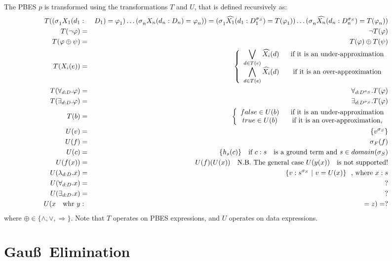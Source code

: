\documentclass{article}
\begin{document}
The PBES $p$ is transformed using the transformations $T$ and $U$, that is
defined recursively as:%
\begin{eqnarray*}
T(\mathcal{(\sigma }_{1}X_{1}(d_{1} &:&D_{1})=\varphi _{1})\ldots \mathcal{%
(\sigma }_{n}X_{n}(d_{n}:D_{n})=\varphi _{n}))=\mathcal{(\sigma }_{1}%
\widehat{X_{1}}(d_{1}:D_{1}^{\sigma _{S}})=T(\varphi _{1}))\ldots \mathcal{%
(\sigma }_{n}\widehat{X_{n}}(d_{n}:D_{n}^{\sigma _{S}})=T(\varphi _{n})) \\
T(\lnot \varphi ) &=&\lnot T(\varphi ) \\
T(\varphi \oplus \psi ) &=&T(\varphi )\oplus T(\psi ) \\
T(X_{i}(e)) &=&\left\{ 
\begin{array}{cc}
\dbigvee\limits_{d\in T(e)}\widehat{X_{i}}(d) & \text{if it is an
under-approximation} \\ 
\dbigwedge\limits_{d\in T(e)}\widehat{X_{i}}(d) & \text{if it is an
over-approximation}%
\end{array}%
\right. \\
T(\forall _{d:D}.\varphi ) &=&\forall _{d:D^{\sigma _{S}}}.T(\varphi ) \\
T(\exists _{d:D}.\varphi ) &=&\exists _{d:D^{\sigma _{S}}}.T(\varphi ) \\
T(b) &=&\left\{ 
\begin{array}{cc}
false\in U(b) & \text{if it is an under-approximation} \\ 
true\in U(b) & \text{if it is an over-approximation,}%
\end{array}%
\right. \\
U(v) &=&\{v^{\sigma _{S}}\} \\
U(f) &=&\mathcal{\sigma }_{F}(f) \\
U(c) &=&\{h_{s}(c)\}\text{ if }c:s\text{ is a ground term and }s\in
domain(\sigma _{S}) \\
U(f(x)) &=&U(f)(U(x))\text{ N.B. The general case }U(y(x))\text{ is not
supported!} \\
U(\lambda _{d:D}.x) &=&\{v:s^{\sigma _{S}}\ |\ v=U(x)\}\text{, where }x:s \\
U(\forall _{d:D}.x) &=&? \\
U(\exists _{d:D}.x) &=&? \\
U(x\text{ whr }y &:&=z)=?
\end{eqnarray*}%
where $\oplus \in \{\wedge ,\vee ,\Rightarrow \}$. Note that $T$ operates on
PBES expressions, and $U$ operates on data expressions. \newpage

\section{ Gau\ss\ Elimination}
\end{document}
